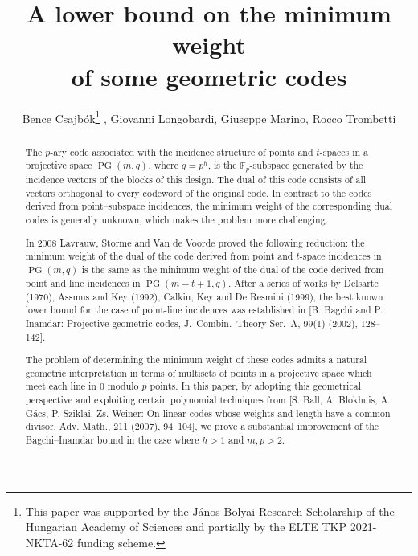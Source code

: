\documentclass[12pt]{article}
\title{A lower bound on the minimum weight \\
	of some geometric codes}
\author{Bence Csajb\'ok\thanks{This paper was supported by the János Bolyai Research Scholarship of the Hungarian Academy of Sciences and partially by the ELTE TKP 2021-NKTA-62 funding scheme.}
	, Giovanni Longobardi, Giuseppe Marino, Rocco Trombetti}
\date{}
\newcommand{\F}{{\mathbb F}}
\DeclareMathOperator{\PG}{{PG}}
\begin{document}
	\maketitle
	
	\begin{abstract}
		
		The $p$-ary code associated with the incidence structure of points and $t$-spaces in a projective space $\PG(m,q)$, where $q=p^h$, is the $\F_p$-subspace generated by the incidence vectors of the blocks of this design. The dual of this code consists of all vectors orthogonal to every codeword of the original code. 
		In contrast to the codes derived from point–subspace incidences, the minimum weight of the corresponding dual codes is generally unknown, which makes the problem more challenging. 
		
		
		
		In 2008 Lavrauw, Storme and Van de Voorde proved the following reduction: the minimum weight of the dual of the code derived from point and $t$-space incidences in $\PG(m,q)$ is the same as the minimum weight of the dual of the code derived from point and line incidences in $\PG(m-t+1,q)$. After a series of works by Delsarte (1970), Assmus and Key (1992), Calkin, Key and De Resmini (1999), the best known lower bound for the case of point-line incidences was established in [B. Bagchi and P. Inamdar:  Projective geometric codes, J.\ Combin.\ Theory Ser.\ A, 99(1) (2002), 128--142].
		
		The problem of determining the minimum weight of these codes admits a natural geometric interpretation in terms of multisets of points in a projective space which meet each line in $0$ modulo $p$ points. 
		In this paper, by adopting this geometrical perspective and exploiting certain polynomial techniques from [S. Ball, A. Blokhuis, A. G\'acs, P. Sziklai, Zs. Weiner: On linear codes whose weights and length have a common divisor, Adv. Math., 211 (2007), 94--104], we prove a substantial improvement of the Bagchi--Inamdar bound in the case where $h>1$ and $m, p >2$. 
		
		
	\end{abstract}
	
\end{document}

